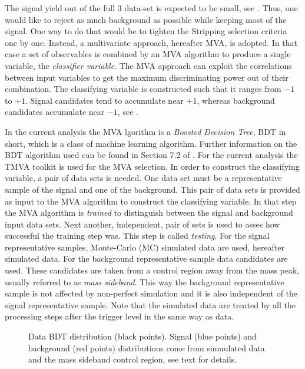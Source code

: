 The \BsJpsiKst signal yield out of the full 3 \invfb data-set is expected to be small, see . Thus, one would like to
reject as much background as possible while keeping most of the signal. One way to do that would be to tighten the Stripping
selection criteria one by one. Instead, a multivariate approach, hereafter MVA, is adopted.
In that case a set of observables is combined by an MVA algorithm to produce a single variable, the {\it classifier variable}.
The MVA approach can exploit the correlations between input variables to get the maximum discriminating power out of their combination.
The classifying variable is constructed such that it ranges from $-1$ to $+1$. Signal candidates tend to accumulate near $+1$,
whereas background candidates accumulate near $-1$, see .

In the current analysis the MVA lgorithm is a {\it Boosted Decision Tree}, BDT in short, which is a class
of machine learning  algorithm. Further information on the BDT algorithm used can be found in Section 7.2 of \cite{TMVA}.
For the current analysis the TMVA toolkit \cite{TMVA} is used for the MVA selection. In order to construct the classifying variable,
a pair of data sets is needed. One data set must be a representative sample of the signal and one of the background.
This pair of data sets is provided as input to the MVA algorithm to construct the classifying variable.
In that step the MVA algorithm is {\it trained} to distinguish between the signal and background input data sets.
Next another, independent, pair of sets is used to asses how successful the training step was. This step is called {\it testing}.
For the signal representative samples, \BsJpsiKst Monte-Carlo (MC) simulated data are used, hereafter simulated data.
For the background representative sample data candidates are used. These candidates are taken from a control
region away from the \BsJpsiKst mass peak, usually referred to as {\it mass sideband}. This way the background representative sample
is not affected by non-perfect simulation and it is also independent of the signal representative sample.
Note that the simulated data are treated by all the processing steps after the \lzero trigger level in the same way as data.

\begin{figure}[!t]
\centering
  \scalebox{1}{}
  \caption{Data BDT distribution (black points). Signal (blue points) and background (red points) distributions
           come from simuulated data and the \Bs mass sideband control region, see text for details.}
  \label{BTDG_performance}
\end{figure}


